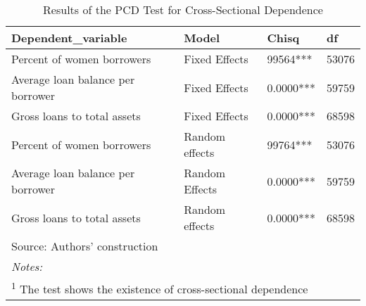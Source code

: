 \documentclass[a4paper,nobind]{templates/ociamthesis}
\begin{document}
\begin{table}

\caption{\label{tab:unnamed-chunk-37}Results of the PCD Test for Cross-Sectional Dependence}
\centering
\begin{tabular}[t]{llll}
\toprule
Dependent\_variable & Model & Chisq & df\\
\midrule
Percent of women borrowers & Fixed Effects & 99564*** & 53076\\
Average loan balance per borrower & Fixed Effects & 0.0000*** & 59759\\
Gross loans to total assets & Fixed Effects & 0.0000*** & 68598\\
Percent of women borrowers & Random effects & 99764*** & 53076\\
Average loan balance per borrower & Random Effects & 0.0000*** & 59759\\
\addlinespace
Gross loans to total assets & Random effects & 0.0000*** & 68598\\
\bottomrule
\multicolumn{4}{l}{\rule{0pt}{1em}Source: Authors' construction}\\
\multicolumn{4}{l}{\rule{0pt}{1em}\textit{Notes: }}\\
\multicolumn{4}{l}{\rule{0pt}{1em}\textsuperscript{1} The test shows the existence of cross-sectional dependence}\\
\end{tabular}
\end{table}
\end{document}
